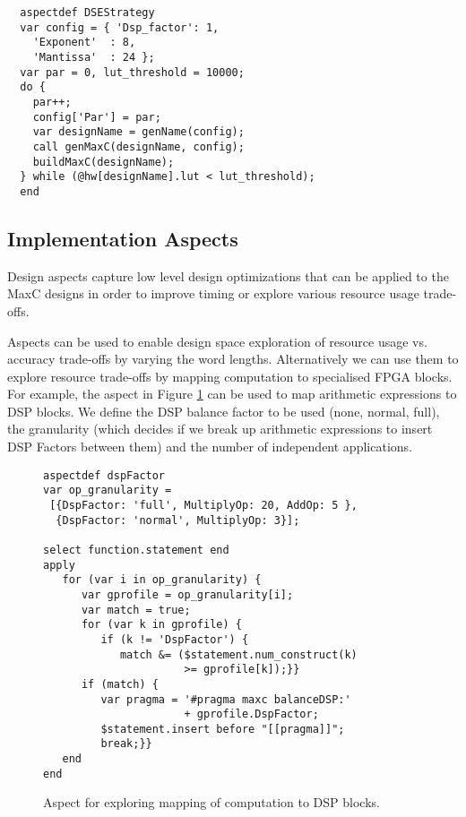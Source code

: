 \lstset{style=lara}
\begin{lstlisting}
  aspectdef DSEStrategy
  var config = { 'Dsp_factor': 1,
    'Exponent'  : 8,
    'Mantissa'  : 24 };
  var par = 0, lut_threshold = 10000;
  do {
    par++;
    config['Par'] = par;
    var designName = genName(config);
    call genMaxC(designName, config);
    buildMaxC(designName);
  } while (@hw[designName].lut < lut_threshold);
  end
\end{lstlisting}

\subsection{Implementation Aspects}

Design aspects capture low level design optimizations that can be
applied to the MaxC designs in order to improve timing or explore
various resource usage trade-offs.

Aspects can be used to enable design space exploration of resource
usage vs. accuracy trade-offs by varying the word
lengths. Alternatively we can use them to explore resource trade-offs
by mapping computation to specialised FPGA blocks. For example, the
aspect in Figure \ref{fig:aspect-DSP} can be used to map arithmetic
expressions to DSP blocks. We define the DSP balance factor to be used
(none, normal, full), the granularity (which decides if we break up
arithmetic expressions to insert DSP Factors between them) and the
number of independent applications.

\lstset{style=lara}
\begin{figure}[!h]
  \centering
  \begin{lstlisting}
aspectdef dspFactor
var op_granularity =
 [{DspFactor: 'full', MultiplyOp: 20, AddOp: 5 },
  {DspFactor: 'normal', MultiplyOp: 3}];

select function.statement end
apply
   for (var i in op_granularity) {
      var gprofile = op_granularity[i];
      var match = true;
      for (var k in gprofile) {
         if (k != 'DspFactor') {
            match &= ($statement.num_construct(k)
                      >= gprofile[k]);}}
      if (match) {
         var pragma = '#pragma maxc balanceDSP:'
                      + gprofile.DspFactor;
         $statement.insert before "[[pragma]]";
         break;}}
   end
end
  \end{lstlisting}
  \caption{Aspect for exploring mapping of computation to DSP blocks.}
  \label{fig:aspect-DSP}
\end{figure}

